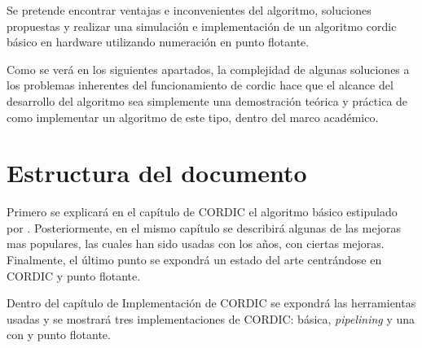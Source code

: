 Se pretende encontrar ventajas e inconvenientes del algoritmo, soluciones propuestas y realizar una simulación e implementación de un algoritmo \gls{cordic} básico en hardware utilizando numeración en punto flotante.

Como se verá en los siguientes apartados, la complejidad de algunas soluciones a los problemas inherentes del funcionamiento de \gls{cordic} hace que el alcance del desarrollo del algoritmo sea simplemente una demostración teórica y práctica de como implementar un algoritmo de este tipo, dentro del marco académico.


\section{Estructura del documento}

Primero se explicará en el capítulo de CORDIC el algoritmo básico estipulado por \cite{volder_cordic_1959}. Posteriormente, en el mismo capítulo se describirá algunas de las mejoras mas populares, las cuales han sido usadas con los años, con ciertas mejoras. Finalmente, el último punto se expondrá un estado del arte centrándose en CORDIC y punto flotante.

Dentro del capítulo de Implementación de CORDIC se expondrá las herramientas usadas y se mostrará tres implementaciones de CORDIC: básica, \textit{pipelining} y una con  y punto flotante.




















